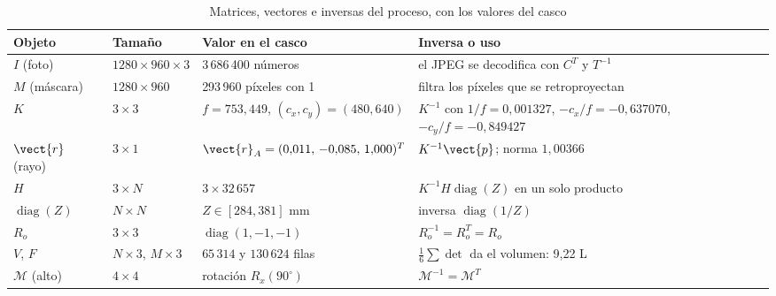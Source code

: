 \begin{table}[htbp]
\caption{Matrices, vectores e inversas del proceso, con los valores del casco}
\label{tab:resumen-algebra}
\centering\small
\begin{tabular}{@{}p{2.3cm}p{3.0cm}p{4.2cm}p{4.0cm}@{}}
\toprule
Objeto & Tamaño & Valor en el casco & Inversa o uso \\
\midrule
$I$ (foto) & $1280\times960\times3$ & 3\,686\,400 números & el JPEG se decodifica con $C^{T}$ y $T^{-1}$ \\
$M$ (máscara) & $1280\times960$ & 293\,960 píxeles con 1 & filtra los píxeles que se retroproyectan \\
$K$ & $3\times3$ & $f=753{,}449$, $(c_x,c_y)=(480,640)$ & $K^{-1}$ con $1/f=0{,}001327$, $-c_x/f=-0{,}637070$, $-c_y/f=-0{,}849427$ \\
$\vect{r}$ (rayo) & $3\times1$ & $\vect{r}_A=(0{,}011,\,-0{,}085,\,1{,}000)^{T}$ & $K^{-1}\vect{p}$; norma $1{,}00366$ \\
$H$ & $3\times N$ & $3\times32\,657$ & $K^{-1}H\operatorname{diag}(Z)$ en un solo producto \\
$\operatorname{diag}(Z)$ & $N\times N$ & $Z\in[284,381]$ mm & inversa $\operatorname{diag}(1/Z)$ \\
$R_o$ & $3\times3$ & $\operatorname{diag}(1,-1,-1)$ & $R_o^{-1}=R_o^{T}=R_o$ \\
$V$, $F$ & $N\times3$, $M\times3$ & $65\,314$ y $130\,624$ filas & $\tfrac16\sum\det$ da el volumen: 9{,}22 L \\
$\mathcal{M}$ (alto) & $4\times4$ & rotación $R_x(90^\circ)$ & $\mathcal{M}^{-1}=\mathcal{M}^{T}$ \\
\bottomrule
\end{tabular}
\end{table}
